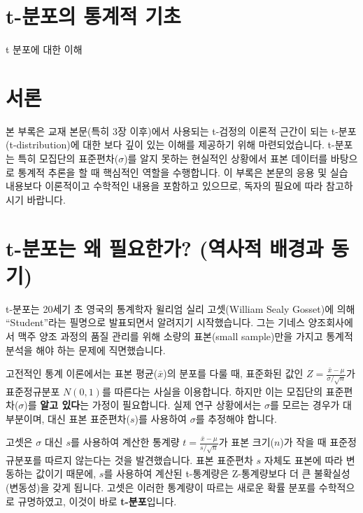 \documentclass[
  letterpaper,
]{book}
\begin{document}
\chapter{}\label{section-11}

\cleardoublepage
{}
{}
\appendix

\chapter{t-분포의 통계적
기초}\label{t-uxbd84uxd3ecuxc758-uxd1b5uxacc4uxc801-uxae30uxcd08}

t 분포에 대한 이해

\hfill\break

\chapter{서론}\label{uxc11cuxb860}

본 부록은 교재 본문(특히 3장 이후)에서 사용되는 t-검정의 이론적 근간이
되는 t-분포(t-distribution)에 대한 보다 깊이 있는 이해를 제공하기 위해
마련되었습니다. t-분포는 특히 모집단의 표준편차(\(\sigma\))를 알지
못하는 현실적인 상황에서 표본 데이터를 바탕으로 통계적 추론을 할 때
핵심적인 역할을 수행합니다. 이 부록은 본문의 응용 및 실습 내용보다
이론적이고 수학적인 내용을 포함하고 있으므로, 독자의 필요에 따라
참고하시기 바랍니다.

\chapter{t-분포는 왜 필요한가? (역사적 배경과
동기)}\label{t-uxbd84uxd3ecuxb294-uxc65c-uxd544uxc694uxd55cuxac00-uxc5eduxc0acuxc801-uxbc30uxacbduxacfc-uxb3d9uxae30}

t-분포는 20세기 초 영국의 통계학자 윌리엄 실리 고셋(William Sealy
Gosset)에 의해 ``Student''라는 필명으로 발표되면서 알려지기
시작했습니다. 그는 기네스 양조회사에서 맥주 양조 과정의 품질 관리를 위해
소량의 표본(small sample)만을 가지고 통계적 분석을 해야 하는 문제에
직면했습니다.

고전적인 통계 이론에서는 표본 평균(\(\bar{x}\))의 분포를 다룰 때,
표준화된 값인 \(Z = \frac{\bar{x} - \mu}{\sigma/\sqrt{n}}\)가
표준정규분포 \(N(0, 1)\)를 따른다는 사실을 이용합니다. 하지만 이는
모집단의 표준편차(\(\sigma\))를 \textbf{알고 있다}는 가정이 필요합니다.
실제 연구 상황에서는 \(\sigma\)를 모르는 경우가 대부분이며, 대신 표본
표준편차(\(s\))를 사용하여 \(\sigma\)를 추정해야 합니다.

고셋은 \(\sigma\) 대신 \(s\)를 사용하여 계산한 통계량
\(t = \frac{\bar{x} - \mu}{s/\sqrt{n}}\)가 표본 크기(\(n\))가 작을 때
표준정규분포를 따르지 않는다는 것을 발견했습니다. 표본 표준편차 \(s\)
자체도 표본에 따라 변동하는 값이기 때문에, \(s\)를 사용하여 계산된
t-통계량은 Z-통계량보다 더 큰 불확실성(변동성)을 갖게 됩니다. 고셋은
이러한 통계량이 따르는 새로운 확률 분포를 수학적으로 규명하였고, 이것이
바로 \textbf{t-분포}입니다.
\end{document}
